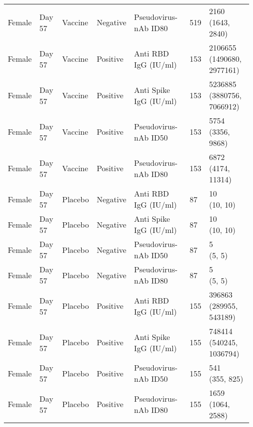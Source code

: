 \documentclass[]{book}
\theoremstyle{definition}
\theoremstyle{definition}
\theoremstyle{definition}
\newcommand{\1}{\mathbbm{1}}
\begin{document}
\begin{landscape}
\begin{ThreePartTable}
\begin{longtable}[t]{>{\raggedright\arraybackslash}p{7cm}llllll}
\hspace{1em}Female & Day 57 & Vaccine & Negative & Pseudovirus-nAb ID80 & 519 & \makecell[l]{2160\\(1643, 2840)}\\
\hspace{1em}Female & Day 57 & Vaccine & Positive & Anti RBD IgG (IU/ml) & 153 & \makecell[l]{2106655\\(1490680, 2977161)}\\
\hspace{1em}Female & Day 57 & Vaccine & Positive & Anti Spike IgG (IU/ml) & 153 & \makecell[l]{5236885\\(3880756, 7066912)}\\
\hspace{1em}Female & Day 57 & Vaccine & Positive & Pseudovirus-nAb ID50 & 153 & \makecell[l]{5754\\(3356, 9868)}\\
\hspace{1em}Female & Day 57 & Vaccine & Positive & Pseudovirus-nAb ID80 & 153 & \makecell[l]{6872\\(4174, 11314)}\\
\hspace{1em}Female & Day 57 & Placebo & Negative & Anti RBD IgG (IU/ml) & 87 & \makecell[l]{10\\(10, 10)}\\
\hspace{1em}Female & Day 57 & Placebo & Negative & Anti Spike IgG (IU/ml) & 87 & \makecell[l]{10\\(10, 10)}\\
\hspace{1em}Female & Day 57 & Placebo & Negative & Pseudovirus-nAb ID50 & 87 & \makecell[l]{5\\(5, 5)}\\
\hspace{1em}Female & Day 57 & Placebo & Negative & Pseudovirus-nAb ID80 & 87 & \makecell[l]{5\\(5, 5)}\\
\hspace{1em}Female & Day 57 & Placebo & Positive & Anti RBD IgG (IU/ml) & 155 & \makecell[l]{396863\\(289955, 543189)}\\
\hspace{1em}Female & Day 57 & Placebo & Positive & Anti Spike IgG (IU/ml) & 155 & \makecell[l]{748414\\(540245, 1036794)}\\
\hspace{1em}Female & Day 57 & Placebo & Positive & Pseudovirus-nAb ID50 & 155 & \makecell[l]{541\\(355, 825)}\\
\hspace{1em}Female & Day 57 & Placebo & Positive & Pseudovirus-nAb ID80 & 155 & \makecell[l]{1659\\(1064, 2588)}\\*
\end{longtable}
\end{ThreePartTable}



\end{landscape}
\end{document}

